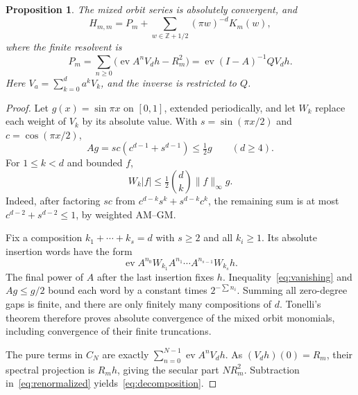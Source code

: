 \documentclass[11pt,a4paper]{article}
\newtheorem{proposition}[theorem]{Proposition}\newtheorem{corollary}[theorem]{Corollary}
\theoremstyle{remark}\newtheorem*{ednote}{Editorial note (ProveIt, 2026-10-01)}
\newcommand{\Z}{\mathbb Z}\newcommand{\ii}{\mathrm i}\newcommand{\ev}{\operatorname{ev}}
\begin{document}
\begin{proposition}\label{prop:mixed}
The mixed orbit series is absolutely convergent, and
\begin{equation}\label{eq:decomposition}
 H_{m,m}=P_m+\sum_{w\in\Z+1/2}(\pi w)^{-d}K_m(w),
\end{equation}
where the finite resolvent is
\[
 P_m=\sum_{n\ge0}\bigl(\ev A^nV_dh-R_m^2\bigr)
     =\ev(I-A)^{-1}QV_dh.
\]
Here $V_a=\sum_{k=0}^da^kV_k$, and the inverse is restricted to $Q$.
\end{proposition}
\begin{proof}
Let $g(x)=\sin\pi x$ on $[0,1]$, extended periodically, and let $W_k$ replace each weight of $V_k$ by its absolute value. With $s=\sin(\pi x/2)$ and $c=\cos(\pi x/2)$,
\[
 Ag=sc(c^{d-1}+s^{d-1})\le\tfrac12g\qquad(d\ge4).
\]
For $1\le k<d$ and bounded $f$,
\begin{equation}\label{eq:vanishing}
 W_k|f|\le\tfrac12\binom dk\|f\|_\infty g.
\end{equation}
Indeed, after factoring $sc$ from $c^{d-k}s^k+s^{d-k}c^k$, the remaining sum is at most $c^{d-2}+s^{d-2}\le1$, by weighted AM--GM.

Fix a composition $k_1+\cdots+k_s=d$ with $s\ge2$ and all $k_i\ge1$. Its absolute insertion words have the form
\[
 \ev A^{n_0}W_{k_1}A^{n_1}\cdots A^{n_{s-1}}W_{k_s}h.
\]
The final power of $A$ after the last insertion fixes $h$. Inequality~\eqref{eq:vanishing} and $Ag\le g/2$ bound each word by a constant times $2^{-\sum n_i}$. Summing all zero-degree gaps is finite, and there are only finitely many compositions of $d$. Tonelli's theorem therefore proves absolute convergence of the mixed orbit monomials, including convergence of their finite truncations.

The pure terms in $C_N$ are exactly $\sum_{n=0}^{N-1}\ev A^nV_dh$. As $(V_dh)(0)=R_m$, their spectral projection is $R_mh$, giving the secular part $NR_m^2$. Subtraction in~\eqref{eq:renormalized} yields~\eqref{eq:decomposition}.
\end{proof}
\end{document}
